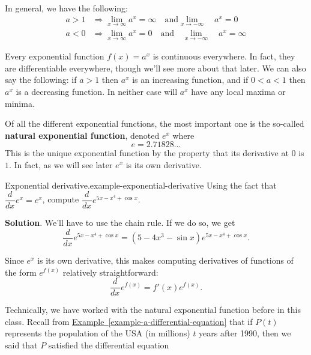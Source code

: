 \documentclass[10pt,]{book}
\newcommand{\terminology}[1]{\textbf{#1}}
\numberwithin{equation}{section}
\newcommand{\dv}[3][]{\dfrac{d^{#1} #2}{d #3^{#1}}}
\begin{document}
\hypertarget{p-190}{}%
In general, we have the following:%
\begin{align*}
a > 1 & \Rightarrow \lim_{x\to\infty}a^{x} = \infty\quad\text{and}\lim_{x\to-\infty}\quad a^{x} = 0 \\
a < 0 & \Rightarrow \lim_{x\to\infty}a^{x} = 0\quad\text{and}\quad\lim_{x\to-\infty}\quad a^{x} = \infty 
\end{align*}
%
\par
\hypertarget{p-191}{}%
Every exponential function \(f(x) = a^{x}\) is continuous everywhere. In fact, they are differentiable everywhere, though we'll see more about that later. We can also say the following: if \(a > 1\) then \(a^{x}\) is an increasing function, and if \(0 < a < 1\) then \(a^{x}\) is a decreasing function. In neither case will \(a^{x}\) have any local maxima or minima.%
\par
\hypertarget{p-192}{}%
Of all the different exponential functions, the most important one is the so-called \terminology{natural exponential function}, denoted \(e^{x}\) where%
\begin{equation*}
e = 2.71828...
\end{equation*}
This is the unique exponential function by the property that its derivative at \(0\) is \(1\). In fact, as we will see later \(e^{x}\) is its own derivative.%
\begin{example}{Exponential derivative.}{example-exponential-derivative}%
\hypertarget{p-193}{}%
Using the fact that \(\dv{}{x}e^{x} = e^{x}\), compute \(\dv{}{x}e^{5x - x^{4} + \cos x}\).%
\par\smallskip%
\noindent\textbf{Solution}.\hypertarget{solution-43}{}\quad%
\hypertarget{p-194}{}%
We'll have to use the chain rule. If we do so, we get%
\begin{equation*}
\dv{}{x}e^{5x - x^{4} + \cos x} = (5 - 4x^{3} - \sin x)e^{5x - x^{4} + \cos x}.
\end{equation*}
%
\end{example}
\hypertarget{p-195}{}%
Since \(e^{x}\) is its own derivative, this makes computing derivatives of functions of the form \(e^{f(x)}\) relatively straightforward:%
\begin{equation*}
\dv{}{x}e^{f(x)} = f'(x)e^{f(x)}.
\end{equation*}
%
\par
\hypertarget{p-196}{}%
Technically, we have worked with the natural exponential function before in this class. Recall from \hyperref[example-a-differential-equation]{Example~\ref{example-a-differential-equation}} that if \(P(t)\) represents the population of the USA (in millions) \(t\) years after 1990, then we said that \(P\) satisfied the differential equation%
\end{document}
